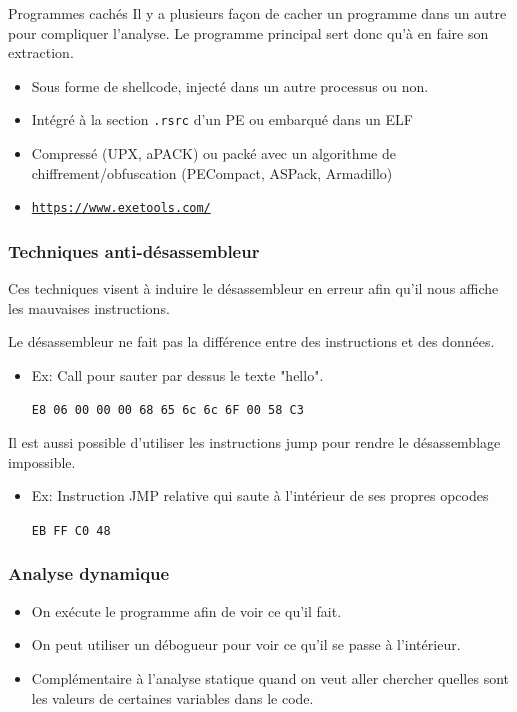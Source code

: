 \documentclass[10pt,xcolor={table,dvipsnames},t]{beamer}
\begin{document}
\begin{frame}{Programmes cachés}
    Il y a plusieurs façon de cacher un programme dans un autre pour compliquer l'analyse. Le programme principal sert donc qu'à en faire son extraction.
    \begin{itemize}
        \item Sous forme de shellcode, injecté dans un autre processus ou non.
        \item Intégré à la section \texttt{.rsrc} d'un PE ou embarqué dans un ELF
        \item Compressé (UPX, aPACK) ou packé avec un algorithme de chiffrement/obfuscation (PECompact, ASPack, Armadillo)
        \item \href{https://www.exetools.com/}{\texttt{https://www.exetools.com/}}
    \end{itemize}
\end{frame}


\begin{frame}
    \frametitle{Techniques anti-désassembleur}
    Ces techniques visent à induire le désassembleur en erreur afin qu'il nous affiche les mauvaises instructions.
    
    Le désassembleur ne fait pas la différence entre des instructions et des données.
    \begin{itemize}
        \item Ex: Call pour sauter par dessus le texte "hello". 
        
        \texttt{E8 06 00 00 00 68 65 6c 6c 6F 00 58 C3}
    \end{itemize}
    
    Il est aussi possible d'utiliser les instructions jump pour rendre le désassemblage impossible.
    \begin{itemize}
        \item Ex: Instruction JMP relative qui saute à l'intérieur de ses propres opcodes
        
        \texttt{EB FF C0 48}
    \end{itemize}

\end{frame}


\begin{frame}
    \frametitle{Analyse dynamique}
    \begin{itemize}
        \item On exécute le programme afin de voir ce qu'il fait.
        \item On peut utiliser un débogueur pour voir ce qu'il se passe à l'intérieur.
        \item Complémentaire à l'analyse statique quand on veut aller chercher quelles sont les valeurs de certaines variables dans le code.
    \end{itemize}

\end{frame}
\end{document}
